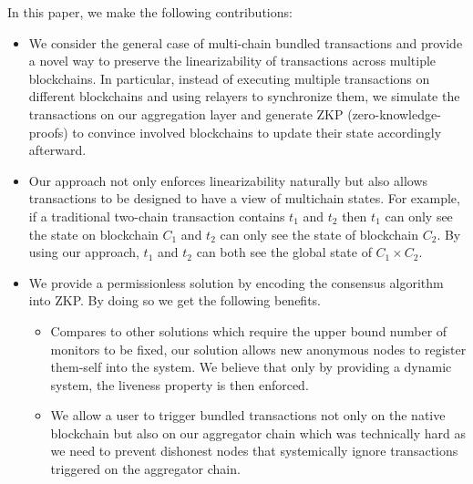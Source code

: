 In this paper, we make the following contributions:
\begin{itemize}
\item We consider the general case of multi-chain bundled transactions and provide a novel way to preserve the linearizability of transactions across multiple blockchains. In particular, instead of executing multiple transactions on different blockchains and using relayers to synchronize them, we simulate the transactions on our aggregation layer and generate ZKP (zero-knowledge-proofs) to convince involved blockchains to update their state accordingly afterward. 

\item Our approach not only enforces linearizability naturally but also allows transactions to be designed to have a view of multichain states. For example, if a traditional two-chain transaction contains $t_1$ and $t_2$ then $t_1$ can only see the state on blockchain $C_1$ and $t_2$ can only see the state of blockchain $C_2$. By using our approach, $t_1$ and $t_2$ can both see the global state of $C_1 \times C_2$.

\item We provide a permissionless solution by encoding the consensus algorithm into ZKP. By doing so we get the following benefits.
\begin{itemize}
    \item Compares to other solutions which require the upper bound number of monitors to be fixed, our solution allows new anonymous nodes to register them-self into the system. We believe that only by providing a dynamic system, the liveness property is then enforced.
    \item We allow a user to trigger bundled transactions not only on the native blockchain but also on our aggregator chain which was technically hard as we need to prevent dishonest nodes that systemically ignore transactions triggered on the aggregator chain.
    \end{itemize}
\end{itemize}